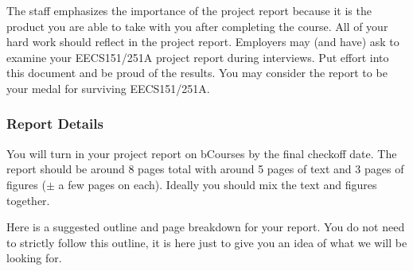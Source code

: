 \documentclass[11pt]{article}
\begin{document}
The staff emphasizes the importance of the project report because it is the product you are able to take with you after completing the course.  All of your hard work should reflect in the project report. Employers may (and have) ask to examine your EECS151/251A project report during interviews. Put effort into this document and be proud of the results. You may consider the report to be your medal for surviving EECS151/251A.

\subsubsection{Report Details}
You will turn in your project report on bCourses by the final checkoff date. The report should be around 8 pages total with around 5 pages of text and 3 pages of figures ($\pm$ a few pages on each). Ideally you should mix the text and figures together.

Here is a suggested outline and page breakdown for your report. You do not need to strictly follow this outline, it is here just to give you an idea of what we will be looking for.
\end{document}
